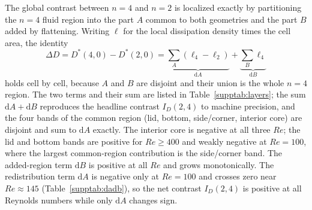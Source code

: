 The global contrast between $n=4$ and $n=2$ is localized exactly by partitioning the $n=4$ fluid region into the part $A$ common to both geometries and the part $B$ added by flattening. Writing $\ell$ for the local dissipation density times the cell area, the identity
\begin{equation}
\Delta D=D^*(4,0)-D^*(2,0)=\underbrace{\sum_{A}(\ell_4-\ell_2)}_{\mathrm{d}A}+\underbrace{\sum_{B}\ell_4}_{\mathrm{d}B}
\end{equation}
holds cell by cell, because $A$ and $B$ are disjoint and their union is the whole $n=4$ region. The two terms and their sum are listed in Table~\ref{supptab:layers}; the sum $\mathrm{d}A+\mathrm{d}B$ reproduces the headline contrast $I_D(2,4)$ to machine precision, and the four bands of the common region (lid, bottom, side/corner, interior core) are disjoint and sum to $\mathrm{d}A$ exactly. The interior core is negative at all three $Re$; the lid and bottom bands are positive for $Re\ge400$ and weakly negative at $Re=100$, where the largest common-region contribution is the side/corner band. The added-region term $\mathrm{d}B$ is positive at all $Re$ and grows monotonically. The redistribution term $\mathrm{d}A$ is negative only at $Re=100$ and crosses zero near $Re\approx145$ (Table~\ref{supptab:dadb}), so the net contrast $I_D(2,4)$ is positive at all Reynolds numbers while only $\mathrm{d}A$ changes sign.

